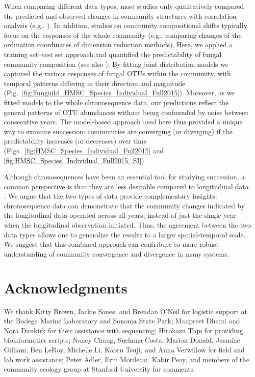 When comparing different data types, most studies only qualitatively compared the predicted and observed changes in community structures with correlation analysis (e.g., \citealp{Foster2000, vanbreugel2006, Lebrijatrejos2010}). In addition, studies on community compositional shifts typically focus on the responses of the whole community (e.g., comparing changes of the ordination coordinates of dimension reduction methods).  
Here, we applied a training set--test set approach and quantified the predictability of fungal community composition (see also \citealp{Mora2015}). 
By fitting joint distribution models \citep{Ovaskainen2017} we captured the various responses of fungal OTUs within the community, with temporal patterns differing in their direction and magnitude (Fig.~\ref{fig:Funguild_HMSC_Species_Individual_Full2015}). 
Moreover, as we fitted models to the whole chronosequence data, our predictions reflect the general patterns of OTU abundances without being confounded by noise between consecutive years.
The model-based approach used here thus provided a unique way to examine succession: communities are converging (or diverging) if the predictability increases (or decreases) over time (Figs.~\ref{fig:HMSC_Species_Individual_Full2015} and \ref{fig:HMSC_Species_Individual_Full2015_SI}).
\par


Although chronosequences have been an essential tool for studying succession, a common perspective is that they are less desirable compared to longitudinal data \citep{Johnson2008}. 
We argue that the two types of data provide complementary insights: chronosequence data can demonstrate that the community changes indicated by the longitudinal data operated across all years, instead of just the single year when the longitudinal observation initiated. Thus, the agreement between the two data types allows one to generalize the results to a larger spatial-temporal scale.
We suggest that this combined approach can contribute to more robust understanding of community convergence and divergence in many systems.
\par



\section{Acknowledgments}
We thank Kitty Brown, Jackie Sones, and Brendan O'Neil for logistic support at the Bodega Marine Laboratory and Sonoma State Park; Manpreet Dhami and Nora Dunkirk for their assistance with sequencing; Hirokazu Toju for providing bioinformatics scripts; Nancy Chang, Suchana Costa, Marion Donald, Jasmine Gilliam, Ben LeRoy, Michelle Li, Kaoru Tsuji, and Anna Verwillow for field and lab work assistance; Peter Adler, Erin Mordecai, Kabir Peay, and members of the community ecology group at Stanford University for comments.



